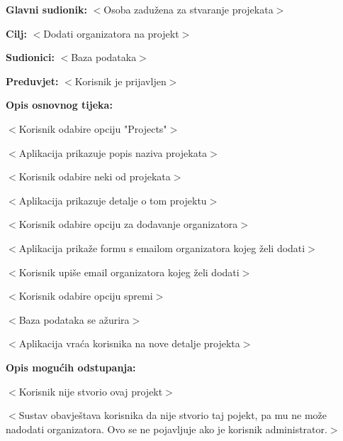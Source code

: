 					\noindent {}
					\begin{packed_item}
					
						\item \textbf{Glavni sudionik:} $<$Osoba zadužena za stvaranje projekata$>$
						\item \textbf{Cilj:} $<$Dodati organizatora na projekt$>$
						\item \textbf{Sudionici:} $<$Baza podataka$>$
						\item \textbf{Preduvjet:} $<$Korisnik je prijavljen$>$
						\item \textbf{Opis osnovnog tijeka:}
					
						\item[] \begin{packed_enum}
					
							\item $<$Korisnik odabire opciju "Projects"$>$
							\item $<$Aplikacija prikazuje popis naziva projekata$>$
							\item $<$Korisnik odabire neki od projekata$>$
							\item $<$Aplikacija prikazuje detalje o tom projektu$>$
							\item $<$Korisnik odabire opciju za dodavanje organizatora$>$
							\item $<$Aplikacija prikaže formu s emailom organizatora kojeg želi dodati$>$
							\item $<$Korisnik upiše email organizatora kojeg želi dodati$>$
							\item $<$Korisnik odabire opciju spremi$>$
							\item $<$Baza podataka se ažurira$>$
							\item $<$Aplikacija vraća korisnika na nove detalje projekta$>$
						\end{packed_enum}
					
						\item \textbf{Opis mogućih odstupanja:}
					
						\item[] \begin{packed_item}
					
							\item[7.a] $<$Korisnik nije stvorio ovaj projekt$>$
							\item[] \begin{packed_enum}
			
								\item $<$Sustav obavještava korisnika da nije stvorio taj pojekt, pa mu ne može nadodati organizatora.
								Ovo se ne pojavljuje ako je korisnik administrator.$>$
			

\end{packed_enum}
\end{packed_item}
\end{packed_item}
